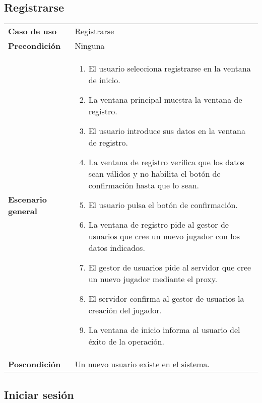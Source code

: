 

\subsection{Registrarse}

{\footnotesize
\begin{tabularx}{0.95\textwidth}{p{}|X}

\textbf{Caso de uso} & Registrarse \\

\textbf{Precondición} & Ninguna \\

\textbf{Escenario general} & \begin{enumerate}
\item El usuario selecciona registrarse en la ventana de inicio.
\item La ventana principal muestra la ventana de registro.
\item El usuario introduce sus datos en la ventana de registro.
\item La ventana de registro verifica que los datos sean válidos y no habilita
el botón de confirmación hasta que lo sean.
\item El usuario pulsa el botón de confirmación.
\item La ventana de registro pide al gestor de usuarios que cree un nuevo
jugador con los datos indicados.
\item El gestor de usuarios pide al servidor que cree un nuevo jugador mediante
el proxy.
\item El servidor confirma al gestor de usuarios la creación del jugador.
\item La ventana de inicio informa al usuario del éxito de la operación.
\end{enumerate} \\

\textbf{Poscondición} & Un nuevo usuario existe en el sistema.

\end{tabularx}
}

\subsection{Iniciar sesión}


